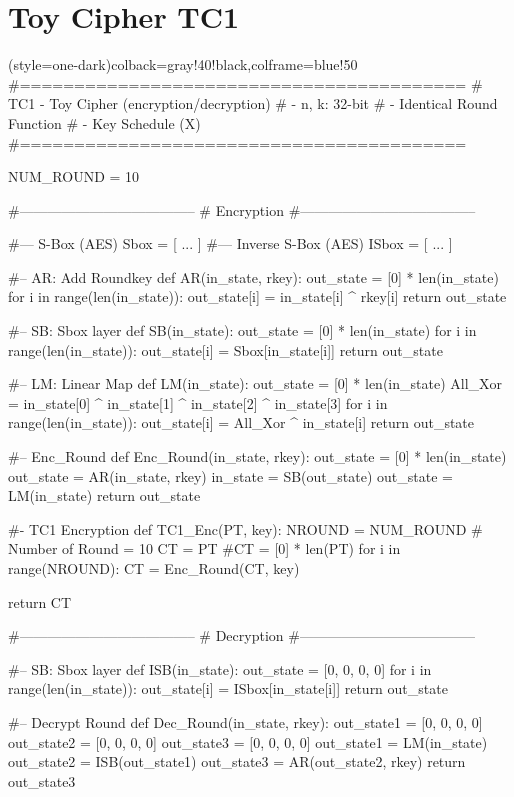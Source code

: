 \section{Toy Cipher TC1}
\begin{python}[TC1Lib.py](style=one-dark){colback=gray!40!black,colframe=blue!50}
#=========================================
# TC1 - Toy Cipher (encryption/decryption)
# - n, k: 32-bit
# - Identical Round Function
# - Key Schedule (X)
#=========================================

NUM_ROUND = 10

#--------------------------------------
#  Encryption
#--------------------------------------

#--- S-Box (AES)
Sbox = [ ... ]
#--- Inverse S-Box (AES)
ISbox = [ ... ]

#-- AR: Add Roundkey
def AR(in_state, rkey):
   out_state = [0] * len(in_state)
   for i in range(len(in_state)):
      out_state[i] = in_state[i] ^ rkey[i] 
   return out_state

#-- SB: Sbox layer
def SB(in_state):
   out_state = [0] * len(in_state)
   for i in range(len(in_state)):
      out_state[i] = Sbox[in_state[i]]
   return out_state

#-- LM: Linear Map
def LM(in_state):
   out_state = [0] * len(in_state)
   All_Xor = in_state[0] ^ in_state[1] ^ in_state[2] ^ in_state[3]
   for i in range(len(in_state)):
      out_state[i] = All_Xor ^ in_state[i]
   return out_state

#-- Enc_Round
def Enc_Round(in_state, rkey):
   out_state = [0] * len(in_state)
   out_state = AR(in_state, rkey)
   in_state = SB(out_state)
   out_state = LM(in_state)
   return out_state

#- TC1 Encryption
def TC1_Enc(PT, key):
   NROUND = NUM_ROUND # Number of Round = 10
   CT = PT #CT = [0] * len(PT)
   for i in range(NROUND):
      CT = Enc_Round(CT, key)
   
   return CT

#--------------------------------------
#  Decryption
#--------------------------------------

#-- SB: Sbox layer
def ISB(in_state):
   out_state = [0, 0, 0, 0]
   for i in range(len(in_state)):
      out_state[i] = ISbox[in_state[i]]
   return out_state

#-- Decrypt Round
def Dec_Round(in_state, rkey):
   out_state1 = [0, 0, 0, 0]
   out_state2 = [0, 0, 0, 0]
   out_state3 = [0, 0, 0, 0]
   out_state1 = LM(in_state)
   out_state2 = ISB(out_state1)
   out_state3 = AR(out_state2, rkey)
   return out_state3





\end{python}
